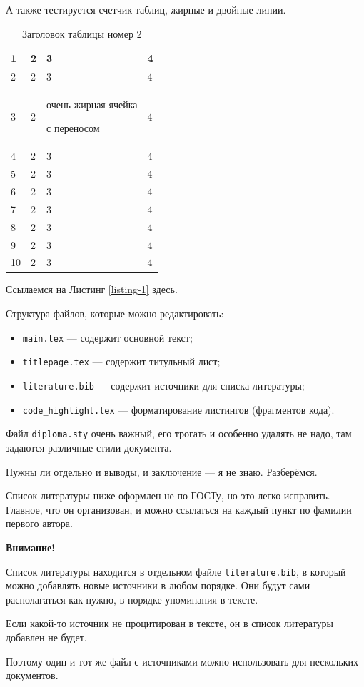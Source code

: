 \documentclass[a4paper,14pt]{extarticle}
\begin{document}
А также тестируется счетчик таблиц, жирные и двойные линии.

\begin{center}
    \begin{longtable}{|p{2cm}||p{3cm}|p{7cm}|p{3cm}|}
    \caption{Заголовок таблицы номер 2}\\
    \hline
    1 & 2 & 3 & 4\\ 
    \hline
    2 & 2 & 3 & 4\\
    \hline
    3 & 2 & очень жирная ячейка \par с переносом & 4\\
    \hline
    4 & 2 & 3 & 4\\
    \hline
    5 & 2 & 3 & 4\\
    \hline
    6 & 2 & 3 & 4\\
    \hline
    7 & 2 & 3 & 4\\
    \hline
    8 & 2 & 3 & 4\\
    \hline
    9 & 2 & 3 & 4\\
    \hline
    10 & 2 & 3 & 4\\
    \hline
    
    
    \end{longtable}
\end{center}

Ссылаемся на Листинг \ref{listing-1} здесь.

\pagebreak
{}
Структура файлов, которые можно редактировать:

\begin{itemize}
    \item \verb|main.tex| --- содержит основной текст;
    \item \verb|titlepage.tex| --- содержит титульный лист;
    \item \verb|literature.bib| --- содержит источники для списка литературы;
    \item \verb|code_highlight.tex| --- форматирование листингов (фрагментов кода).
\end{itemize}

Файл \verb|diploma.sty| очень важный, его трогать и особенно удалять не надо, там задаются различные стили документа.

Нужны ли отдельно и выводы, и заключение --- я не знаю. Разберёмся.

Список литературы ниже оформлен не по ГОСТу, но это легко исправить. Главное, что он организован, и можно ссылаться на каждый пункт по фамилии первого автора.

\textbf{Внимание!} 

Список литературы находится в отдельном файле \verb|literature.bib|, в который можно добавлять новые источники в любом порядке. Они будут сами располагаться как нужно, в порядке упоминания в тексте.

Если какой-то источник не процитирован в тексте, он в список литературы добавлен не будет.

Поэтому один и тот же файл с источниками можно использовать для нескольких документов.

\printbibliography
\end{document}
